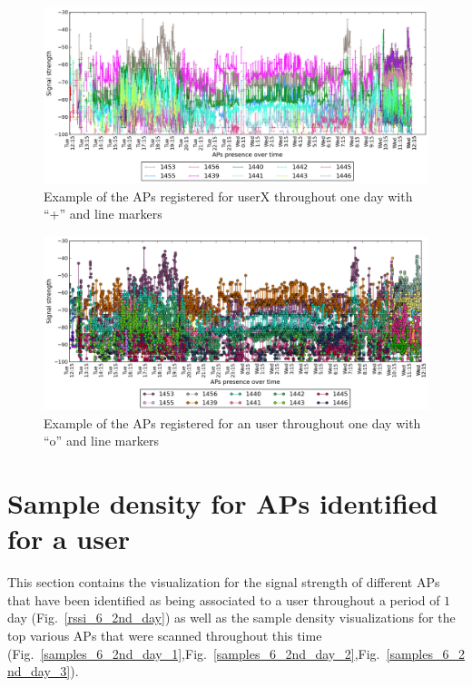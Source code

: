 \begin{figure}[!h]
\centering
\includegraphics[height =
0.45\textwidth]{figures/cros_line_user_6_sorted_1days_plot.png}
\caption{Example of the APs registered for userX throughout one day with
``+'' and line markers}
\label{user_6_cross_line_1d}
\end{figure}

\begin{figure}[!h]
\centering
\includegraphics[height =
0.45\textwidth]{figures/o_line_user_6_sorted_1days_plot.png}
\caption{Example of the APs registered for an user throughout one day with
``o'' and line markers}
\label{user_6_o_line_1d}
\end{figure}

\section{Sample density for APs identified for a user}
\label{appendix_sample_density}

This section contains the visualization for the signal strength of different APs
that have been identified as being associated to a user throughout a period of
$1$ day (Fig.~\ref{rssi_6_2nd_day}) as well as the sample density visualizations
for the top various APs that were scanned throughout this time
(Fig.~\ref{samples_6_2nd_day_1},Fig.~\ref{samples_6_2nd_day_2},Fig.~\ref{samples_6_2nd_day_3}).

